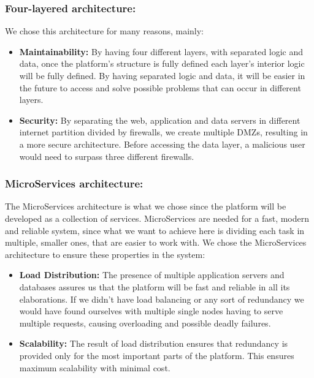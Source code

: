 \documentclass{article}
\begin{document}
{    \subsubsection{Four-layered architecture:} We chose this architecture for many reasons, mainly:
    \begin{itemize}
        \item \textbf{Maintainability:} By having four different layers, with separated logic and data, once the platform's structure is fully defined
        each layer's interior logic will be fully defined.
        By having separated logic and data, it will be easier in the future to access and solve possible problems that can occur in different 
        layers.
        \item \textbf{Security:} By separating the web, application and data servers in different internet partition divided by firewalls, we create multiple
        DMZs, resulting in a more secure architecture. Before accessing the data layer, a malicious user would need to surpass three different firewalls. 
    \end{itemize}
    \subsubsection{MicroServices architecture:} The MicroServices architecture is what we chose since the platform will be developed as a collection of 
    services. MicroServices are needed for a fast, modern and reliable system, since what we want to achieve here is dividing each task in multiple, 
    smaller ones, that are easier to work with.
    We chose the MicroServices architecture to ensure these properties in the system:
    \begin{itemize}
        \item \textbf{Load Distribution:} The presence of multiple application servers and databases assures us that the platform will be fast 
        and reliable in all its elaborations. If we didn't have load balancing or any sort of redundancy we would have found ourselves with multiple
        single nodes having to serve multiple requests, causing overloading and possible deadly failures.
        \item \textbf{Scalability:} The result of load distribution ensures that redundancy is provided only for the most important parts of the platform.
        This ensures maximum scalability with minimal cost.
    \end{itemize}
}
\end{document}

